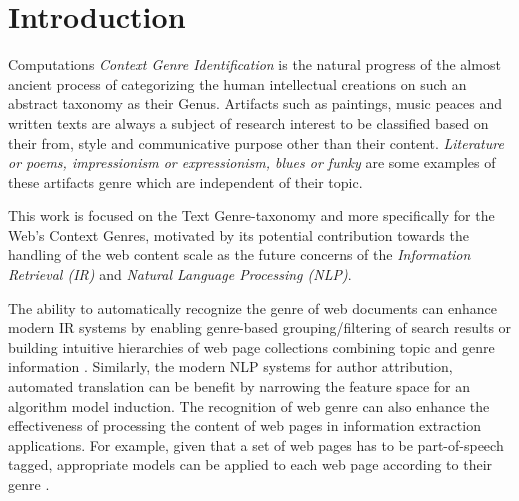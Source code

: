 \documentclass[
    11pt, %
    english, %
    singlespacing, %
    headsepline, %
]{DoctoralThesis} %
\begin{document}
\tableofcontents %


\mainmatter %
\pagestyle{thesis} %

\chapter*{Introduction}\label{sec:intro}

Computations \textit{Context Genre Identification} is the natural progress of the almost ancient process of categorizing the human intellectual creations on such an abstract taxonomy as their Genus. Artifacts such as paintings, music peaces and written texts are always a subject of research interest to be classified based on their from, style and communicative purpose other than their content. \textit{Literature or poems, impressionism or expressionism, blues or funky} are some examples of these artifacts genre which are independent of their topic.

This work is focused on the Text Genre-taxonomy and more specifically for the Web's Context Genres, motivated by its potential contribution towards the handling of the web content scale as the future concerns of the \textit{Information Retrieval (IR)} and \textit{Natural Language Processing (NLP)}. 

The ability to automatically recognize the genre of web documents can enhance modern IR systems by enabling genre-based grouping/filtering of search results or building intuitive hierarchies of web page collections combining topic and genre information \parencite{Braslavski2007,Rosso2008,de2009genre}. Similarly, the modern NLP systems for author attribution, automated translation can be benefit by narrowing the feature space for an algorithm model induction. The recognition of web genre can also enhance the effectiveness of processing the content of web pages in information extraction applications. For example, given that a set of web pages has to be part-of-speech tagged, appropriate models can be applied to each web page according to their genre \parencite{Nooralahzadeh2014}.
\end{document}
